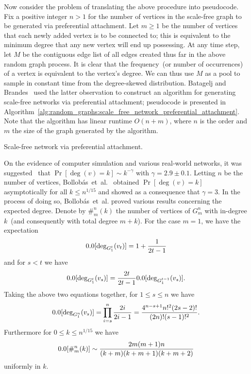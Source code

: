 Now consider the problem of translating the above procedure into
pseudocode. Fix a positive integer $n > 1$ for the number of vertices
in the scale-free graph to be generated via preferential
attachment. Let $m \geq 1$ be the number of vertices that each newly
added vertex is to be connected to; this is equivalent to the minimum
degree that any new vertex will end up possessing. At any time step,
let $M$ be the contiguous edge list of all edges created thus far in
the above random graph process. It is clear that the frequency~(or
number of occurrences) of a vertex is equivalent to the vertex's
degree. We can thus use $M$ as a pool to sample in constant time from
the degree-skewed distribution. Batagelj and
Brandes~\cite{BatageljBrandes2005} used the latter observation to
construct an algorithm for generating scale-free networks via
preferential attachment; pseudocode is presented in
Algorithm~\ref{alg:random_graphs:scale_free_network_preferential_attachment}.
Note that the algorithm has linear runtime $O(n + m)$, where $n$ is
the order and $m$ the size of the graph generated by the algorithm.

\begin{algorithm}[!htbp]

\caption{Scale-free network via preferential attachment.}
\label{alg:random_graphs:scale_free_network_preferential_attachment}
\end{algorithm}

On the evidence of computer simulation and various real-world
networks, it was suggested~\cite{BarabasiAlbert1999,BarabasiEtAl1999}
that $\Pr[\deg(v) = k] \sim k^{-\gamma}$ with
$\gamma = 2.9 \pm 0.1$. Letting $n$ be the number of vertices,
Bollob\'as~et~al.~\cite{BollobasEtAl2001} obtained
$\Pr[\deg(v) = k]$ asymptotically for all $k \leq n^{1/15}$ and showed
as a consequence that $\gamma = 3$. In the process of doing so,
Bollob\'as~et~al. proved various results concerning the expected
degree. Denote by $\#_m^n(k)$ the number of vertices of $G_m^n$ with
in-degree $k$~(and consequently with total degree $m + k$). For the
case $m = 1$, we have the expectation
\[
\E[\deg_{G_1^t}(v_t)]
=
1 + \frac{1} {2t - 1}
\]
and for $s < t$ we have
\[
\E[\deg_{G_1^t}(v_s)]
=
\frac{2t} {2t - 1} \E[\deg_{G_1^{t-1}}(v_s)].
\]
Taking the above two equations together, for $1 \leq s \leq n$ we have
\[
\E[\deg_{G_1^n}(v_s)]
=
\prod_{i=s}^n \frac{2i} {2i - 1}
=
\frac{4^{n-s+1} n!^2 (2s-2)!} {(2n)! (s-1)!^2}.
\]
Furthermore for $0 \leq k \leq n^{1/15}$ we have
\[
\E[\#_m^n(k)]
\sim
\frac{2m(m+1)n} {(k+m) (k+m+1) (k+m+2)}
\]
uniformly in $k$.

